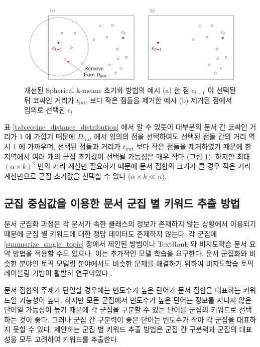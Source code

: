 \documentclass[oneside, ko,phd]{snuthesis_utf8_kor}
\begin{document}
\begin{figure}[H]
\centering
\includegraphics[keepaspectratio=true, width=0.95\linewidth]{fig/kmeans_initialization.png}
\caption{개선된 Spherical k-means 초기화 방법의 예시 (a) 한 점 $c_{t-1}$ 이 선택된 뒤 코싸인 거리가 $t_{init}$ 보다 작은 점들을 제거한 예시 (b) 제거된 점에서 임의로 선택된 $c_t$}
\label{fig:initialization}
\end{figure}

표 \ref{tab:cosine_distance_distribution} 에서 알 수 있듯이 대부분의 문서 간 코싸인 거리가 1 에 가깝기 때문에 $D_{init}$ 에서 임의의 점을 선택하여도 선택된 점들 간의 거리 역시 1 에 가까우며, 선택된 점들과 거리가 $t_{init}$ 보다 작은 점들을 제거하였기 때문에 한 지역에서 여러 개의 군집 초기값이 선택될 가능성은 매우 작다 (그림 \ref{fig:initialization}).
하지만 최대 $(\alpha \times k)^2$ 번의 거리 계산만 필요하기 때문에 문서 집합의 크기가 클 경우 적은 거리 계산만으로 군집 초기값을 선택할 수 있다 ($\alpha \times k \ll n$).


\subsection{군집 중심값을 이용한 문서 군집 별 키워드 추출 방법}

문서 군집화 과정은 각 문서가 속한 클래스의 정보가 존재하지 않는 상황에서 이용되기 때문에 군집 별 키워드에 대한 정답 데이터도 존재하지 않는다.
각 군집에 \ref{summarize_single_topic} 장에서 제안된 방법이나 TextRank 와 비지도학습 문서 요약 방법을 적용할 수도 있으나, 이는 추가적인 모델 학습을 요구한다.
문서 군집화와 비슷한 분야인 토픽 모델링 분야에서도 비슷한 문제를 해결하기 위하여 비지도학습 토픽 레이블링 기법이 활발히 연구되었다 \cite{newman2010evaluating, sievert2014ldavis, chuang2012interpretation, snyder2013topic, chuang2012termite, blei2003latent}.

문서 집합의 주제가 단일할 경우에는 빈도수가 높은 단어가 문서 집합을 대표하는 키워드일 가능성이 높다.
하지만 모든 군집에서 빈도수가 높은 단어는 정보를 지니지 않은 단어일 가능성이 높기 때문에 각 군집을 구분할 수 있는 단어를 군집의 키워드로 선택하는 것이 좋다.
그러나 군집 간 구분력이 좋은 단어는 빈도수가 작아 각 군집을 대표하지 못할 수 있다.
제안하는 군집 별 키워드 추출 방법은 군집 간 구분력과 군집의 대표성을 모두 고려하여 키워드를 추출한다.
\end{document}
